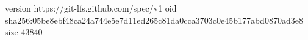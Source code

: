 version https://git-lfs.github.com/spec/v1
oid sha256:05be8ebf48ca24a744e5e7d11ed265c81da0cca3703c0e45b177abd0870ad3e8
size 43840
